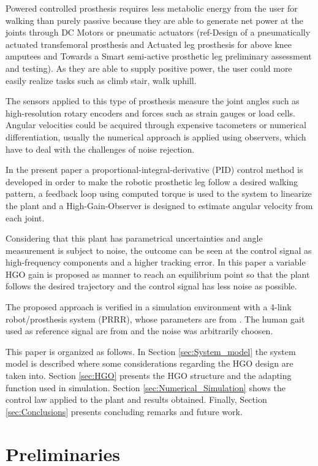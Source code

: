 \documentclass[letterpaper, 10 pt, journal, twocolumn]{IEEEtran}  %
\theoremstyle{plain}
\theoremstyle{definition}
\theoremstyle{remark}
\begin{document}
Powered controlled prosthesis requires less metabolic energy from the user for walking than purely passive because they are able to generate net power at the joints through DC Motors or pneumatic actuators (ref-Design of a pneumatically actuated transfemoral prosthesis and Actuated leg prosthesis for above knee amputees and Towards a Smart semi-active prosthetic leg preliminary assessment and testing). As they are able to supply positive power, the user could more easily realize tasks such as climb stair, walk uphill.

The sensors applied to this type of prosthesis measure the joint angles such as high-resolution rotary encoders and forces such as strain gauges or load cells. Angular velocities could be acquired through expensive tacometers or numerical differentiation, usually the numerical approach is applied using observers, which have to deal with the challenges of noise rejection.  

In the present paper a proportional-integral-derivative (PID) control method is developed in order to make the robotic prosthetic leg follow a desired walking pattern, a feedback loop using computed torque is used to the system to linearize the plant and a High-Gain-Observer is designed to estimate angular velocity from each joint. 

Considering that this plant has parametrical uncertainties and angle measurement is subject to noise, the outcome can be seen at the control signal as high-frequency components and a higher tracking error. In this paper a variable HGO gain is proposed as manner to reach an equilibrium point so that the plant follows the desired trajectory and the control signal has less noise as possible. 

The proposed approach is verified in a simulation environment with a 4-link robot/prosthesis system (PRRR), whose parameters are from \cite{Richter2015}. The human gait used as reference signal are from \cite{Schwartz2008} and the noise was arbitrarily choosen.

This paper is organized as follows. In Section \ref{sec:System_model} the system model is described where some considerations regarding the HGO design are taken into. Section \ref{sec:HGO} presents the HGO structure and the adapting function used in simulation. Section \ref{sec:Numerical_Simulation} shows the control law applied to the plant and results obtained. Finally, Section \ref{sec:Conclusions} presents concluding remarks and future work.

\section{Preliminaries}
\end{document}
